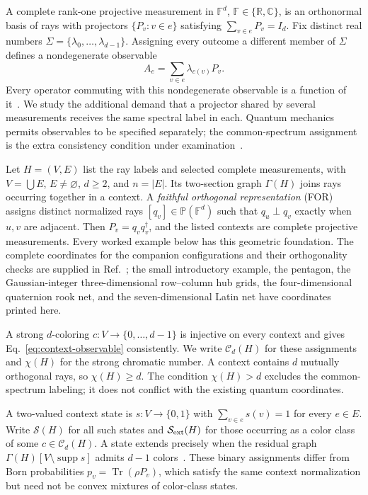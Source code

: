 \documentclass[aps,pra,reprint,superscriptaddress,longbibliography,nofootinbib,floatfix,10pt]{revtex4-2}
\theoremstyle{definition}\newtheorem{definition}[theorem]{Definition}
\theoremstyle{remark}\newtheorem{remark}[theorem]{Remark}
\newcommand{\Sc}{\mathcal S}\newcommand{\Cc}{\mathcal C}
\begin{document}
A complete rank-one projective measurement in $\mathbb F^d$, $\mathbb F\in\{\mathbb R,\mathbb C\}$, is an orthonormal basis of rays with projectors $\{P_v:v\in e\}$ satisfying $\sum_{v\in e}P_v=I_d$. Fix distinct real numbers $\Sigma=\{\lambda_0,\ldots,\lambda_{d-1}\}$. Assigning every outcome a different member of $\Sigma$ defines a nondegenerate observable
\begin{equation}\label{eq:context-observable}
A_e=\sum_{v\in e}\lambda_{c(v)}P_v.
\end{equation}
Every operator commuting with this nondegenerate observable is a function of it~\cite{v-neumann-31,halmos-vs}. We study the additional demand that a projector shared by several measurements receives the same spectral label in each. Quantum mechanics permits observables to be specified separately; the common-spectrum assignment is the extra consistency condition under examination~\cite{svozil-2020-c,svozil-2021-chroma,svozil2026contexts}.

Let $H=(V,E)$ list the ray labels and selected complete measurements, with $V=\bigcup E$, $E\ne\varnothing$, $d\ge2$, and $n=|E|$. Its two-section graph $\Gamma(H)$ joins rays occurring together in a context. A \emph{faithful orthogonal representation} (FOR) assigns distinct normalized rays $[q_v]\in\mathbb P(\mathbb F^d)$ such that $q_u\perp q_v$ exactly when $u,v$ are adjacent. Then $P_v=q_vq_v^\dagger$, and the listed contexts are complete projective measurements. Every worked example below has this geometric foundation. The complete coordinates for the companion configurations and their orthogonality checks are supplied in Ref.~\cite{svozil2026contexts,supplement}; the small introductory example, the pentagon, the Gaussian-integer three-dimensional row--column hub grids, the four-dimensional quaternion rook net, and the seven-dimensional Latin net have coordinates printed here.

A strong $d$-coloring $c:V\to\{0,\ldots,d-1\}$ is injective on every context and gives Eq.~\eqref{eq:context-observable} consistently. We write $\Cc_d(H)$ for these assignments and $\chi(H)$ for the strong chromatic number. A context contains $d$ mutually orthogonal rays, so $\chi(H)\ge d$. The condition $\chi(H)>d$ excludes the common-spectrum labeling; it does not conflict with the existing quantum coordinates.

A two-valued context state is $s:V\to\{0,1\}$ with $\sum_{v\in e}s(v)=1$ for every $e\in E$. Write $\Sc(H)$ for all such states and $\Sc_{\rm ext}(H)$ for those occurring as a color class of some $c\in\Cc_d(H)$. A state extends precisely when the residual graph $\Gamma(H)[V\setminus\operatorname{supp}s]$ admits $d-1$ colors~\cite{svozil2026contexts}. These binary assignments differ from Born probabilities $p_v=\operatorname{Tr}(\rho P_v)$, which satisfy the same context normalization but need not be convex mixtures of color-class states.
\end{document}
